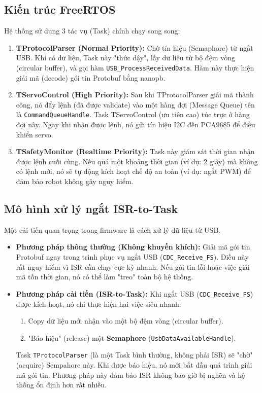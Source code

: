 \documentclass[12pt, a4paper, oneside]{report}
\numberwithin{equation}{chapter} %
\numberwithin{figure}{chapter}   %
\numberwithin{table}{chapter}    %
\begin{document}
\subsection{Kiến trúc FreeRTOS}
Hệ thống sử dụng 3 tác vụ (Task) chính chạy song song:

\begin{enumerate}
    \item \textbf{TProtocolParser (Normal Priority):}
    Chờ tín hiệu (Semaphore) từ ngắt USB. Khi có dữ liệu, Task này "thức dậy", lấy dữ liệu từ bộ đệm vòng (circular buffer), và gọi hàm \texttt{USB\_ProcessReceivedData}. Hàm này thực hiện giải mã (decode) gói tin Protobuf bằng nanopb.
    
    \item \textbf{TServoControl (High Priority):}
    Sau khi TProtocolParser giải mã thành công, nó đẩy lệnh (đã được validate) vào một hàng đợi (Message Queue) tên là \texttt{CommandQueueHandle}. Task TServoControl (ưu tiên cao) túc trực ở hàng đợi này. Ngay khi nhận được lệnh, nó gửi tín hiệu I2C đến PCA9685 để điều khiển servo.
    
    \item \textbf{TSafetyMonitor (Realtime Priority):}
    Task này giám sát thời gian nhận được lệnh cuối cùng. Nếu quá một khoảng thời gian (ví dụ: 2 giây) mà không có lệnh mới, nó sẽ tự động kích hoạt chế độ an toàn (ví dụ: ngắt PWM) để đảm bảo robot không gây nguy hiểm.
\end{enumerate}

\subsection{Mô hình xử lý ngắt ISR-to-Task}
Một cải tiến quan trọng trong firmware là cách xử lý dữ liệu từ USB.

\begin{itemize}
    \item \textbf{Phương pháp thông thường (Không khuyến khích):} Giải mã gói tin Protobuf ngay trong trình phục vụ ngắt USB (\texttt{CDC\_Receive\_FS}). Điều này rất nguy hiểm vì ISR cần chạy cực kỳ nhanh. Nếu gói tin lỗi hoặc việc giải mã tốn thời gian, nó có thể làm "treo" toàn bộ hệ thống.
    
    \item \textbf{Phương pháp cải tiến (ISR-to-Task):}
    Khi ngắt USB (\texttt{CDC\_Receive\_FS}) được kích hoạt, nó chỉ thực hiện hai việc siêu nhanh:
    \begin{enumerate}
        \item Copy dữ liệu mới nhận vào một bộ đệm vòng (circular buffer).
        \item "Báo hiệu" (release) một \textbf{Semaphore} (\texttt{UsbDataAvailableHandle}).
    \end{enumerate}
    Task \texttt{TProtocolParser} (là một Task bình thường, không phải ISR) sẽ "chờ" (acquire) Sempahore này. Khi được báo hiệu, nó mới bắt đầu quá trình giải mã gói tin. Phương pháp này đảm bảo ISR không bao giờ bị nghẽn và hệ thống ổn định hơn rất nhiều.
\end{itemize}
\end{document}
